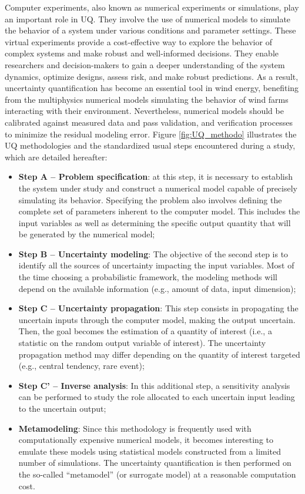 Computer experiments, also known as numerical experiments or simulations, play an important role in UQ. 
They involve the use of numerical models to simulate the behavior of a system under various conditions and parameter settings. 
These virtual experiments provide a cost-effective way to explore the behavior of complex systems and make robust and well-informed decisions.
They enable researchers and decision-makers to gain a deeper understanding of the system dynamics, optimize designs, assess risk, and make robust predictions. 
As a result, uncertainty quantification has become an essential tool in wind energy, benefiting from the multiphysics numerical models simulating the behavior of wind farms interacting with their environment.
Nevertheless, numerical models should be calibrated against measured data and pass validation, and verification processes  to minimize the residual modeling error.
Figure \ref{fig:UQ_methodo} illustrates the UQ methodologies and the standardized usual steps encountered during a study, which are detailed hereafter: 
\begin{itemize}
    \item \textbf{Step A -- Problem specification}: at this step, it is necessary to establish the system under study and construct a numerical model capable of precisely simulating its behavior.
    Specifying the problem also involves defining the complete set of parameters inherent to the computer model. 
    This includes the input variables as well as determining the specific output quantity that will be generated by the numerical model;
    \item \textbf{Step B -- Uncertainty modeling}: The objective of the second step is to identify all the sources of uncertainty impacting the input variables.
    Most of the time choosing a probabilistic framework, the modeling methods will depend on the available information (e.g., amount of data, input dimension);
    \item \textbf{Step C -- Uncertainty propagation}: This step consists in propagating the uncertain inputs through the computer model, making the output uncertain. 
    Then, the goal becomes the estimation of a quantity of interest (i.e., a statistic on the random output variable of interest).
    The uncertainty propagation method may differ depending on the quantity of interest targeted (e.g., central tendency, rare event);    
    \item \textbf{Step C' -- Inverse analysis}: In this additional step, a sensitivity analysis can be performed to study the role allocated to each uncertain input leading to the uncertain output;    
    \item \textbf{Metamodeling}: Since this methodology is frequently used with computationally expensive numerical models, it becomes interesting to emulate these models using statistical models constructed from a limited number of simulations.
    The uncertainty quantification is then performed on the so-called ``metamodel'' (or surrogate model) at a reasonable computation cost.
\end{itemize}


